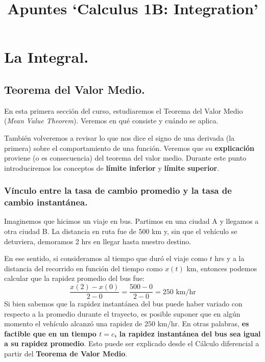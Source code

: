 \documentclass[12pt]{article}
\title{Apuntes `Calculus 1B: Integration'}
\author{}
\date{}
\begin{document}
\maketitle
\tableofcontents

\newpage

\section{La Integral.}

\subsection{Teorema del Valor Medio.}

En esta primera sección del curso, estudiaremos el Teorema del Valor Medio (\textit{Mean Value Theorem}). Veremos en qué consiste y cuándo se aplica.

También volveremos a revisar lo que nos dice el signo de una derivada (la primera) sobre el comportamiento de una función. Veremos que su \textbf{explicación} proviene (o es consecuencia) del teorema del valor medio. Durante este punto introduciremos los conceptos de \textbf{límite inferior} y \textbf{límite superior}.


\subsubsection{Vínculo entre la tasa de cambio promedio y la tasa de cambio instantánea.}

Imaginemos que hicimos un viaje en bus. Partimos en una ciudad A y llegamos a otra ciudad B. La distancia en ruta fue de 500 km y, sin que el vehículo se detuviera, demoramos 2 hrs en llegar hasta nuestro destino.

En ese sentido, si consideramos al tiempo que duró el viaje como $t$ hrs y a la distancia del recorrido en función del tiempo como $x(t)$ km, entonces podemos calcular que la rapidez promedio del bus fue:
\[
	\frac{x(2) - x(0)}{2 - 0} =
	\frac{500 - 0}{2 - 0} =
	250 \text{ km/hr}
\]
Si bien sabemos que la rapidez instantánea del bus puede haber variado con respecto a la promedio durante el trayecto, es posible suponer que en algún momento el vehículo alcanzó una rapidez de $250$ km/hr. En otras palabras, \textbf{es factible que en un tiempo $t = c$, la rapidez instantánea del bus sea igual a su rapidez promedio}. Esto puede ser explicado desde el Cálculo diferencial a partir del \textbf{Teorema de Valor Medio}.
\end{document}
